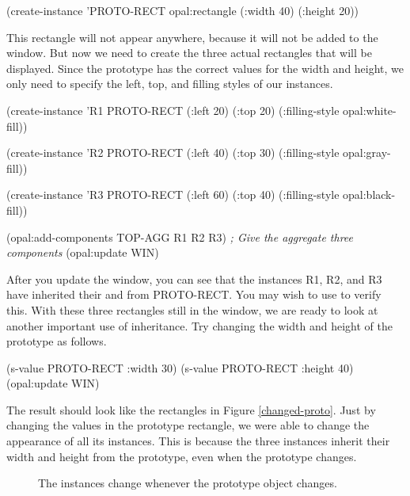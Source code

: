 \begin{programexample}
(create-instance 'PROTO-RECT opal:rectangle
   (:width 40) (:height 20))
\end{programexample}

This rectangle will not appear anywhere, because it will not be added
to the window.  But now we need to create the three actual rectangles
that will be displayed.  Since the prototype has the correct values
for the width and height, we only need to specify the left, top, and
filling styles of our instances.

\begin{programexample}
(create-instance 'R1 PROTO-RECT
   (:left 20) (:top 20)
   (:filling-style opal:white-fill))

(create-instance 'R2 PROTO-RECT
   (:left 40) (:top 30)
   (:filling-style opal:gray-fill))

(create-instance 'R3 PROTO-RECT
   (:left 60) (:top 40)
   (:filling-style opal:black-fill))

(opal:add-components TOP-AGG R1 R2 R3)  {\it ; Give the aggregate three components}
(opal:update WIN)
\end{programexample}

After you update the window, you can see that the instances R1, R2,
and R3 have inherited their  and  from
PROTO-RECT.  You may wish to use  to verify this.  With
these three rectangles still in the window, we are ready to look at
another important use of inheritance.  Try changing the width and
height of the prototype as follows.

\begin{programexample}
(s-value PROTO-RECT :width 30)
(s-value PROTO-RECT :height 40)
(opal:update WIN)
\end{programexample}

The result should look like the rectangles in Figure \ref{changed-proto}.
Just by changing the values in the prototype rectangle, we were able
to change the appearance of all its instances.  This is because the
three instances inherit their width and height from the prototype,
even when the prototype changes.

\begin{figure}
\begin{center}
  \end{center}
\caption{The instances change whenever the prototype object changes.}
\end{figure}


